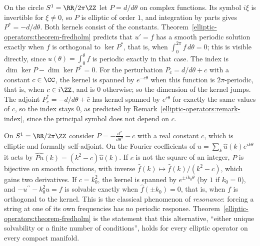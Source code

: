\begin{example}\label{elliptic-operators:example-circle-derivative}
On the circle $S^1 = \RR/2\pi\ZZ$ let $P = d/d\theta$ on complex functions. Its symbol $i\xi$ is invertible for $\xi \neq 0$, so $P$ is elliptic of order $1$, and integration by parts gives $P^* = -d/d\theta$. Both kernels
consist of the constants. Theorem~\ref{elliptic-operators:theorem-fredholm} predicts that $u' = f$ has a smooth periodic solution exactly when $f$ is orthogonal to $\ker P^*$, that is, when $\int_0^{2\pi}f\,d\theta = 0$; this
is visible directly, since $u(\theta) = \int_0^\theta f$ is periodic exactly in that case. The index is $\dim\ker P - \dim\ker P^* = 0$. For the perturbation $P_c = d/d\theta + c$ with a constant $c \in \CC$, the kernel is
spanned by $e^{-c\theta}$ when this function is $2\pi$-periodic, that is, when $c \in i\ZZ$, and is $0$ otherwise; so the dimension of the kernel jumps. The adjoint $P_c^* = -d/d\theta + \bar c$ has kernel spanned by $e^{\bar c\theta}$ for exactly the same values of $c$, so the index stays $0$,
as predicted by Remark~\ref{elliptic-operators:remark-index}, since the principal symbol does not depend on $c$.
\end{example}

\begin{example}\label{elliptic-operators:example-fredholm-alternative}
On $S^1 = \RR/2\pi\ZZ$ consider $P = -\frac{d^2}{d\theta^2} - c$ with a real constant $c$, which is elliptic and formally self-adjoint. On the Fourier coefficients of $u = \sum_k\hat u(k)e^{ik\theta}$ it acts by
$\widehat{Pu}(k) = (k^2 - c)\hat u(k)$. If $c$ is not the square of an integer, $P$ is bijective on smooth functions, with inverse $\hat f(k) \mapsto \hat f(k)/(k^2 - c)$, which gains two derivatives. If
$c = k_0^2$, the kernel is spanned by $e^{\pm ik_0\theta}$ (by $1$ if $k_0 = 0$), and $-u^{\prime\prime} - k_0^2u = f$ is solvable exactly when $\hat f(\pm k_0) = 0$, that is, when $f$ is orthogonal to the kernel. This is
the classical phenomenon of \emph{resonance}: forcing a string at one of its own frequencies has no periodic response. Theorem~\ref{elliptic-operators:theorem-fredholm} is the statement that this
alternative, ``either unique solvability or a finite number of conditions'', holds for every elliptic operator on every compact manifold.
\end{example}

